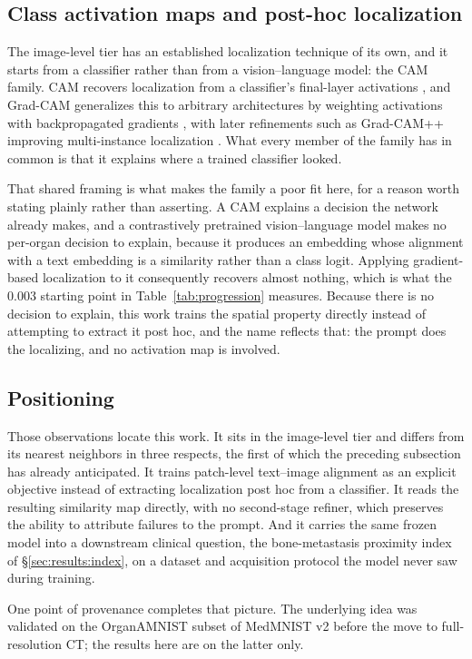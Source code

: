\subsection{Class activation maps and post-hoc localization}

The image-level tier has an established localization technique of its own, and
it starts from a classifier rather than from a vision--language model: the CAM
family. CAM recovers localization from a classifier's final-layer activations
\cite{zhou2016cam}, and Grad-CAM generalizes this to arbitrary architectures by
weighting activations with backpropagated gradients \cite{selvaraju2017gradcam},
with later refinements such as Grad-CAM++ improving multi-instance localization
\cite{chattopadhay2018gradcampp}. What every member of the family has in common
is that it explains where a trained classifier looked.

That shared framing is what makes the family a poor fit here, for a reason worth
stating plainly rather than asserting. A CAM explains a decision the network
already makes, and a contrastively pretrained vision--language model makes no
per-organ decision to explain, because it produces an embedding whose alignment
with a text embedding is a similarity rather than a class logit. Applying
gradient-based localization to it consequently recovers almost nothing, which is
what the 0.003 starting point in Table~\ref{tab:progression} measures. Because
there is no decision to explain, this work trains the spatial property directly
instead of attempting to extract it post hoc, and the name reflects that: the
prompt does the localizing, and no activation map is involved.

\subsection{Positioning}

Those observations locate this work. It sits in the image-level tier and differs
from its nearest neighbors in three respects, the first of which the preceding
subsection has already anticipated. It trains patch-level text--image alignment
as an explicit objective instead of extracting localization post hoc from a
classifier. It reads the resulting similarity map directly, with no second-stage
refiner, which preserves the ability to attribute failures to the prompt. And it
carries the same frozen model into a downstream
clinical question, the bone-metastasis proximity index of
\S\ref{sec:results:index}, on a dataset and acquisition protocol the model never
saw during training.

One point of provenance completes that picture. The underlying idea was
validated on the OrganAMNIST subset of MedMNIST v2 \cite{yang2023medmnist}
before the move to full-resolution CT; the results here are on the latter only.
